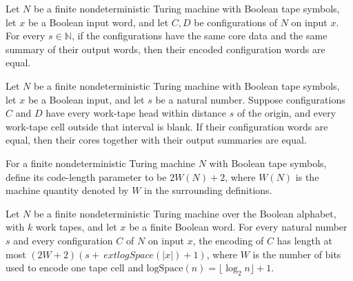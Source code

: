 \begin{theorem}
\label{Complexity.Codec.cfgWord_congr}
\leanok
{}
Let $N$ be a finite nondeterministic Turing machine with Boolean tape symbols, let $x$
be a Boolean input word, and let $C,D$ be configurations of $N$ on input $x$. For every
$s\in\mathbb{N}$, if the configurations have the same core data and the same summary of
their output words, then their encoded configuration words are equal.
\end{theorem}

\begin{theorem}
\label{Complexity.Codec.coreSum_eq_of_cfgWord_eq}
\leanok
{}
Let $N$ be a finite nondeterministic Turing machine with Boolean tape symbols, let $x$
be a Boolean input, and let $s$ be a natural number. Suppose configurations $C$ and $D$
have every work-tape head within distance $s$ of the origin, and every work-tape cell
outside that interval is blank. If their configuration words are equal, then their cores
together with their output summaries are equal.
\end{theorem}

\begin{definition}
\label{Complexity.Codec.codeK}
\leanok
{}
For a finite nondeterministic Turing machine $N$ with Boolean tape symbols, define its
code-length parameter to be $2W(N)+2$, where $W(N)$ is the machine quantity denoted by
$W$ in the surrounding definitions.
\end{definition}

\begin{theorem}
\label{Complexity.Codec.length_cfgWord_le}
\leanok
{}
Let $N$ be a finite nondeterministic Turing machine over the Boolean alphabet, with $k$
work tapes, and let $x$ be a finite Boolean word. For every natural number $s$ and every
configuration $C$ of $N$ on input $x$, the encoding of $C$ has length at most
$(2W+2)(s+\	ext{logSpace}(|x|)+1)$, where $W$ is the number of bits used to encode one
tape cell and $\text{logSpace}(n)=\lfloor\log_2 n\rfloor+1$.
\end{theorem}

